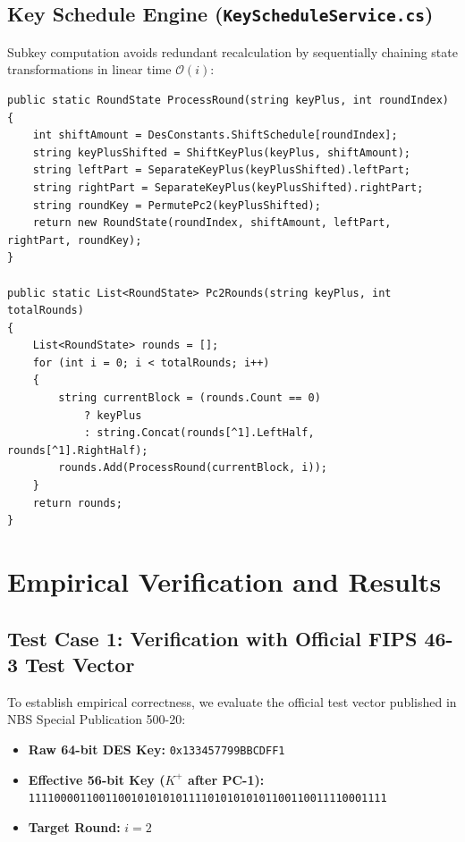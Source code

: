 \documentclass[12pt,a4paper]{article}
\begin{document}
\subsection{Key Schedule Engine (\texttt{KeyScheduleService.cs})}
Subkey computation avoids redundant recalculation by sequentially chaining state transformations in linear time $\mathcal{O}(i)$:
\begin{lstlisting}
public static RoundState ProcessRound(string keyPlus, int roundIndex)
{
    int shiftAmount = DesConstants.ShiftSchedule[roundIndex];
    string keyPlusShifted = ShiftKeyPlus(keyPlus, shiftAmount);
    string leftPart = SeparateKeyPlus(keyPlusShifted).leftPart;
    string rightPart = SeparateKeyPlus(keyPlusShifted).rightPart;
    string roundKey = PermutePc2(keyPlusShifted);
    return new RoundState(roundIndex, shiftAmount, leftPart, rightPart, roundKey);
}

public static List<RoundState> Pc2Rounds(string keyPlus, int totalRounds)
{
    List<RoundState> rounds = [];
    for (int i = 0; i < totalRounds; i++)
    {
        string currentBlock = (rounds.Count == 0)
            ? keyPlus
            : string.Concat(rounds[^1].LeftHalf, rounds[^1].RightHalf);
        rounds.Add(ProcessRound(currentBlock, i));
    }
    return rounds;
}
\end{lstlisting}

\section{Empirical Verification and Results}

\subsection{Test Case 1: Verification with Official FIPS 46-3 Test Vector}
To establish empirical correctness, we evaluate the official test vector published in NBS Special Publication 500-20:
\begin{itemize}
    \item \textbf{Raw 64-bit DES Key:} \texttt{0x133457799BBCDFF1}
    \item \textbf{Effective 56-bit Key ($K^+$ after PC-1):}\\
    \texttt{11110000110011001010101011110101010101100110011110001111}
    \item \textbf{Target Round:} $i = 2$
\end{itemize}
\end{document}
